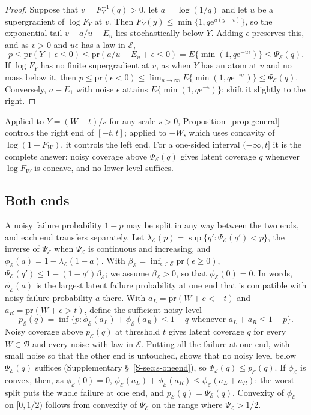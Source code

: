 \documentclass[12pt]{article}
\theoremstyle{definition}
\newcommand{\pr}{\mathrm{pr}}
\newcommand{\B}{\mathcal{B}}
\newcommand{\E}{\mathcal{E}}
\begin{document}
\begin{proof}
Suppose that $v = F_Y^{-1}(q) > 0$, let $a = \log(1/q)$ and let $u$ be a supergradient of $\log F_Y$ at $v$. Then $F_Y(y) \le \min\{1, q\mathrm{e}^{u(y - v)}\}$, so the exponential tail $v + a/u - E_u$ lies stochastically below $Y$. Adding $\epsilon$ preserves this, and as $v > 0$ and $u\epsilon$ has a law in $\E$,
\[
p \le \pr(Y + \epsilon \le 0) \le \pr(a/u - E_u + \epsilon \le 0) = E\{\min(1, q \mathrm{e}^{-u\epsilon})\} \le \Psi_{\E}(q).
\]
If $\log F_Y$ has no finite supergradient at $v$, as when $Y$ has an atom at $v$ and no mass below it, then $p \le \pr(\epsilon < 0) \le \lim_{u\to\infty} E\{\min(1, q \mathrm{e}^{-u\epsilon})\} \le \Psi_{\E}(q)$. Conversely, $a - E_1$ with noise $\epsilon$ attains $E\{\min(1, q \mathrm{e}^{-\epsilon})\}$; shift it slightly to the right.
\end{proof}

Applied to $Y = (W - t)/s$ for any scale $s > 0$, Proposition~\ref{prop:general} controls the right end of $[-t, t]$; applied to $-W$, which uses concavity of $\log(1 - F_W)$, it controls the left end. For a one-sided interval $(-\infty, t]$ it is the complete answer: noisy coverage above $\Psi_{\E}(q)$ gives latent coverage $q$ whenever $\log F_W$ is concave, and no lower level suffices.

\subsection{Both ends}

A noisy failure probability $1 - p$ may be split in any way between the two ends, and each end transfers separately. Let $\lambda_{\E}(p) = \sup\{q' : \Psi_{\E}(q') < p\}$, the inverse of $\Psi_{\E}$ when $\Psi_{\E}$ is continuous and increasing, and $\phi_{\E}(a) = 1 - \lambda_{\E}(1 - a)$. With $\beta_{\E} = \inf_{\epsilon \in \E} \pr(\epsilon \ge 0)$, $\Psi_{\E}(q') \le 1 - (1 - q')\beta_{\E}$; we assume $\beta_{\E} > 0$, so that $\phi_{\E}(0) = 0$. In words, $\phi_{\E}(a)$ is the largest latent failure probability at one end that is compatible with noisy failure probability $a$ there. With $a_L = \pr(W + e < -t)$ and $a_R = \pr(W + e > t)$, define the sufficient noisy level
\begin{equation}\label{eq:pE}
p_{\E}(q) = \inf\{p : \phi_{\E}(a_L) + \phi_{\E}(a_R) \le 1 - q \text{ whenever } a_L + a_R \le 1 - p\}.
\end{equation}
Noisy coverage above $p_{\E}(q)$ at threshold $t$ gives latent coverage $q$ for every $W \in \B$ and every noise with law in $\E$. Putting all the failure at one end, with small noise so that the other end is untouched, shows that no noisy level below $\Psi_{\E}(q)$ suffices (Supplementary \S~\ref{S-sec:s-oneend}), so $\Psi_{\E}(q) \le p_{\E}(q)$. If $\phi_{\E}$ is convex, then, as $\phi_{\E}(0) = 0$, $\phi_{\E}(a_L) + \phi_{\E}(a_R) \le \phi_{\E}(a_L + a_R)$: the worst split puts the whole failure at one end, and $p_{\E}(q) = \Psi_{\E}(q)$. Convexity of $\phi_{\E}$ on $[0, 1/2)$ follows from convexity of $\Psi_{\E}$ on the range where $\Psi_{\E} > 1/2$.
\end{document}
